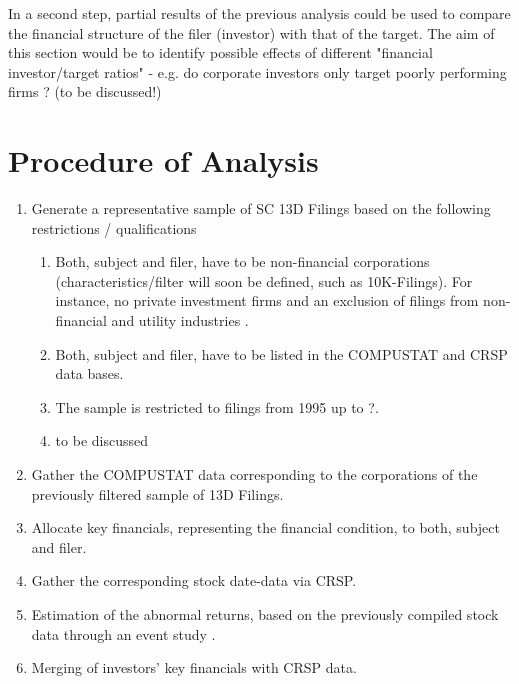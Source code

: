 \documentclass[12pt]{article}
\begin{document}
In a second step, partial results of the previous analysis could be used to compare the financial structure of the filer (investor) with that of the target. The aim of this section would be to identify possible effects of different "financial investor/target ratios" - e.g. do corporate investors only target poorly performing firms \citep{Klein2009}? (to be discussed!)

\section{Procedure of Analysis}

\begin{enumerate}
\item Generate a representative sample of SC 13D Filings based on the following restrictions / qualifications
	
	\begin{enumerate}
	\item Both, subject and filer, have to be non-financial corporations (characteristics/filter will soon be defined, such as 10K-Filings). For instance, no private investment firms and an exclusion of filings from non-financial and utility industries \citep{Brigida2012}.
 	\item Both, subject and filer, have to be listed in the COMPUSTAT and CRSP data bases.
	\item The sample is restricted to filings from 1995 up to ?.
	\item to be discussed
	\end{enumerate}
	
\item Gather the COMPUSTAT data corresponding to the corporations of the previously filtered sample of 13D Filings.
\item Allocate key financials, representing the financial condition, to both, subject and filer.
\item Gather the corresponding stock date-data via CRSP.
\item Estimation of the abnormal returns, based on the previously compiled stock data through an event study \citep{ang2011} \citep{Fama1992} \citep{Kolari2010}. 
\item Merging of investors' key financials with CRSP data.

\end{enumerate}

\pagebreak
\printbibliography[title=Relevant Literature (so far)]
\end{document}

